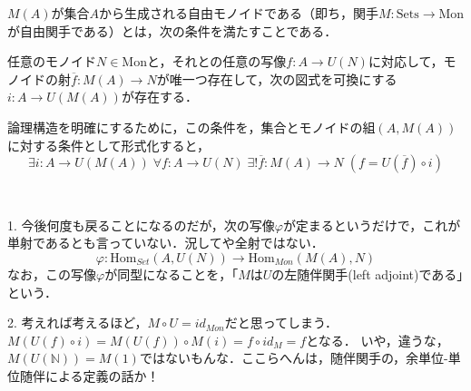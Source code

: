 \documentclass[uplatex, 12pt, dvipdfmx]{jsarticle}
\begin{document}
\begin{definition*}
    $M(A)$が集合$A$から生成される自由モノイドである（即ち，関手$M:\mathrm{Sets}\to\mathrm{Mon}$が自由関手である）とは，次の条件を満たすことである．

    任意のモノイド$N\in\mathrm{Mon}$と，それとの任意の写像$f:A\to U(N)$に対応して，モノイドの射$\overline{f}:M(A)\to N$が唯一つ存在して，次の図式を可換にする$i:A\to U(M(A))$が存在する．
    \begin{center}
    \end{center}
    論理構造を明確にするために，この条件を，集合とモノイドの組$(A,M(A))$に対する条件として形式化すると，
    \[ \exists i:A\to U(M(A))\; \forall f:A\to U(N)\; \exists! \overline{f}:M(A)\to N \; (f=U(\overline{f})\circ i) \]
    \rightline{$\blacksquare$}
\end{definition*}
\begin{remark*}　

    1. 今後何度も戻ることになるのだが，次の写像$\varphi$が定まるというだけで，これが単射であるとも言っていない．況してや全射ではない．
    \[ \varphi:\mathrm{Hom}_{Set}(A,U(N))\to\mathrm{Hom}_{Mon}(M(A),N) \]
    なお，この写像$\varphi$が同型になることを，「$M$は$U$の左随伴関手(left adjoint)である」という．

    2. 考えれば考えるほど，$M\circ U=id_{Mon}$だと思ってしまう．$M(U(f)\circ i)=M(U(f))\circ M(i)=f\circ id_M=f$となる．
    いや，違うな，$M(U(\mathbb{N}))=M(1)$ではないもんな．ここらへんは，随伴関手の，余単位-単位随伴による定義の話か！
\end{remark*}
\end{document}
